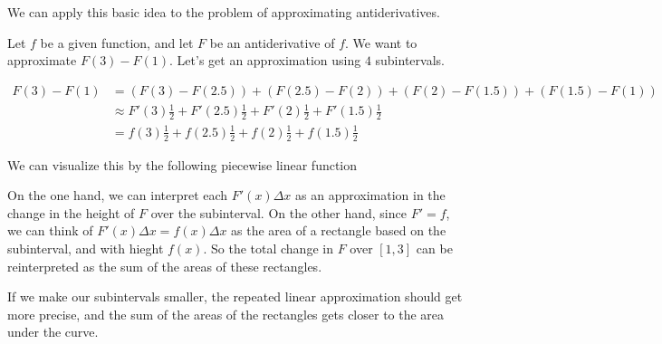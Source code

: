 \documentclass{ximera}
\begin{document}
We can apply this basic idea to the problem of approximating
antiderivatives.

  Let $f$ be a given function, and let $F$ be an antiderivative of $f$.  We want to approximate $F(3) - F(1)$.  Let's get an approximation using $4$ subintervals.
  
  \begin{align*}F(3) - F(1) &= (F(3) - F(2.5))+(F(2.5) - F(2))+(F(2) - F(1.5))+(F(1.5) - F(1))\\
  &\approx F'(3)\frac{1}{2}+F'(2.5)\frac{1}{2}+F'(2)\frac{1}{2}+F'(1.5)\frac{1}{2}\\
  &=f(3)\frac{1}{2}+f(2.5)\frac{1}{2}+f(2)\frac{1}{2}+f(1.5)\frac{1}{2}
  \end{align*}
  
  We can visualize this by the following piecewise linear function
  
  
  On the one hand, we can interpret each $F'(x)\Delta x$ as an approximation in the change in the height of $F$ over the subinterval.  On the other hand, since $F' =f$, we can think of $F'(x)\Delta x = f(x)\Delta x$ as the area of a rectangle based on the subinterval, and with hieght $f(x)$.  So the total change in $F$ over $[1,3]$ can be reinterpreted as the sum of the areas of these rectangles.
  
  
  If we make our subintervals smaller, the repeated linear approximation should get more precise, and the sum of the areas of the rectangles gets closer to the area under the curve.
  
  
\end{document}
